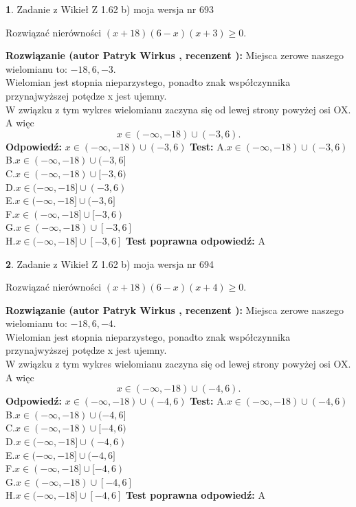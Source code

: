 \documentclass[12pt, a4paper]{article}
\theoremstyle{definition} %
\newtheorem{zad}{}
\newcommand{\zadStart}[1]{\begin{zad}#1\newline}
\newcommand{\zadStop}{\end{zad}}
\newcommand{\rozwStart}[2]{\noindent \textbf{Rozwiązanie (autor #1 , recenzent #2): }\newline}
\newcommand{\rozwStop}{\newline}
\newcommand{\odpStart}{\noindent \textbf{Odpowiedź:}\newline}
\newcommand{\odpStop}{\newline}
\newcommand{\testStart}{\noindent \textbf{Test:}\newline}
\newcommand{\testStop}{\newline}
\newcommand{\kluczStart}{\noindent \textbf{Test poprawna odpowiedź:}\newline}
\newcommand{\kluczStop}{\newline}
\begin{document}
\zadStart{Zadanie z Wikieł Z 1.62 b) moja wersja nr 693}

Rozwiązać nierówności $(x+18)(6-x)(x+3)\ge0$.
\zadStop
\rozwStart{Patryk Wirkus}{}
Miejsca zerowe naszego wielomianu to: $-18, 6, -3$.\\
Wielomian jest stopnia nieparzystego, ponadto znak współczynnika przy\linebreak najwyższej potędze x jest ujemny.\\ W związku z tym wykres wielomianu zaczyna się od lewej strony powyżej osi OX. A więc $$x \in (-\infty,-18) \cup (-3,6).$$
\rozwStop
\odpStart
$x \in (-\infty,-18) \cup (-3,6)$
\odpStop
\testStart
A.$x \in (-\infty,-18) \cup (-3,6)$\\
B.$x \in (-\infty,-18) \cup (-3,6]$\\
C.$x \in (-\infty,-18) \cup [-3,6)$\\
D.$x \in (-\infty,-18] \cup (-3,6)$\\
E.$x \in (-\infty,-18] \cup (-3,6]$\\
F.$x \in (-\infty,-18] \cup [-3,6)$\\
G.$x \in (-\infty,-18) \cup [-3,6]$\\
H.$x \in (-\infty,-18] \cup [-3,6]$
\testStop
\kluczStart
A
\kluczStop



\zadStart{Zadanie z Wikieł Z 1.62 b) moja wersja nr 694}

Rozwiązać nierówności $(x+18)(6-x)(x+4)\ge0$.
\zadStop
\rozwStart{Patryk Wirkus}{}
Miejsca zerowe naszego wielomianu to: $-18, 6, -4$.\\
Wielomian jest stopnia nieparzystego, ponadto znak współczynnika przy\linebreak najwyższej potędze x jest ujemny.\\ W związku z tym wykres wielomianu zaczyna się od lewej strony powyżej osi OX. A więc $$x \in (-\infty,-18) \cup (-4,6).$$
\rozwStop
\odpStart
$x \in (-\infty,-18) \cup (-4,6)$
\odpStop
\testStart
A.$x \in (-\infty,-18) \cup (-4,6)$\\
B.$x \in (-\infty,-18) \cup (-4,6]$\\
C.$x \in (-\infty,-18) \cup [-4,6)$\\
D.$x \in (-\infty,-18] \cup (-4,6)$\\
E.$x \in (-\infty,-18] \cup (-4,6]$\\
F.$x \in (-\infty,-18] \cup [-4,6)$\\
G.$x \in (-\infty,-18) \cup [-4,6]$\\
H.$x \in (-\infty,-18] \cup [-4,6]$
\testStop
\kluczStart
A
\kluczStop
\end{document}

